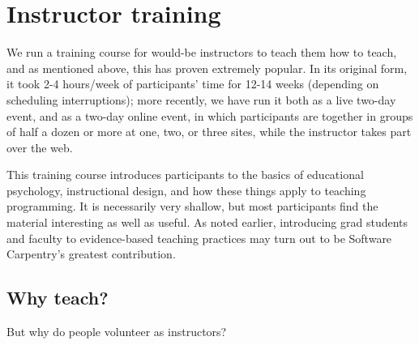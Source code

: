 \documentclass[10pt,a4paper,twocolumn]{article}
\begin{document}
\section*{Instructor training}

We run a training course for would-be instructors to teach them how to
teach, and as mentioned above, this has proven extremely popular.  In
its original form, it took 2-4 hours/week of participants' time for
12-14 weeks (depending on scheduling interruptions); more recently, we
have run it both as a live two-day event, and as a two-day online
event, in which participants are together in groups of half a dozen or
more at one, two, or three sites, while the instructor takes part over
the web.

This training course introduces participants to the basics of
educational psychology, instructional design, and how these things
apply to teaching programming. It is necessarily very shallow, but
most participants find the material interesting as well as useful.  As
noted earlier, introducing grad students and faculty to evidence-based
teaching practices may turn out to be Software Carpentry's greatest
contribution.

\subsection*{Why teach?}

But why do people volunteer as instructors?
\end{document}
